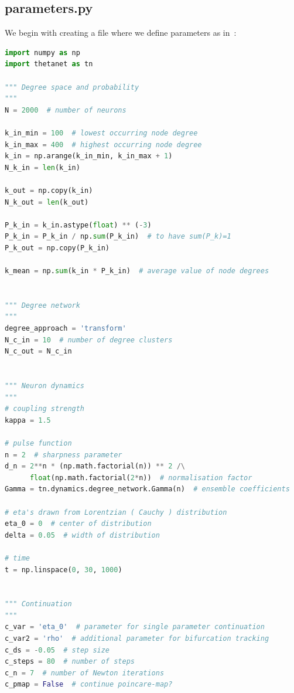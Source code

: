 \documentclass[bibliography=totoc, twoside]{article}
\numberwithin{equation}{section}
\begin{document}
\subsection*{parameters.py}
We begin with creating a file where we define parameters as in~\cite{Laing2019}:
\begin{lstlisting}[language=python]
import numpy as np
import thetanet as tn

""" Degree space and probability
"""
N = 2000  # number of neurons

k_in_min = 100  # lowest occurring node degree
k_in_max = 400  # highest occurring node degree
k_in = np.arange(k_in_min, k_in_max + 1)
N_k_in = len(k_in)

k_out = np.copy(k_in)
N_k_out = len(k_out)

P_k_in = k_in.astype(float) ** (-3)
P_k_in = P_k_in / np.sum(P_k_in)  # to have sum(P_k)=1
P_k_out = np.copy(P_k_in)

k_mean = np.sum(k_in * P_k_in)  # average value of node degrees


""" Degree network
"""
degree_approach = 'transform'
N_c_in = 10  # number of degree clusters
N_c_out = N_c_in


""" Neuron dynamics
"""
# coupling strength
kappa = 1.5

# pulse function
n = 2  # sharpness parameter
d_n = 2**n * (np.math.factorial(n)) ** 2 /\
      float(np.math.factorial(2*n))  # normalisation factor
Gamma = tn.dynamics.degree_network.Gamma(n)  # ensemble coefficients

# eta's drawn from Lorentzian ( Cauchy ) distribution
eta_0 = 0  # center of distribution
delta = 0.05  # width of distribution

# time
t = np.linspace(0, 30, 1000)


""" Continuation
"""
c_var = 'eta_0'  # parameter for single parameter continuation
c_var2 = 'rho'  # additional parameter for bifurcation tracking
c_ds = -0.05  # step size
c_steps = 80  # number of steps
c_n = 7  # number of Newton iterations
c_pmap = False  # continue poincare-map?
\end{lstlisting}
\end{document}
